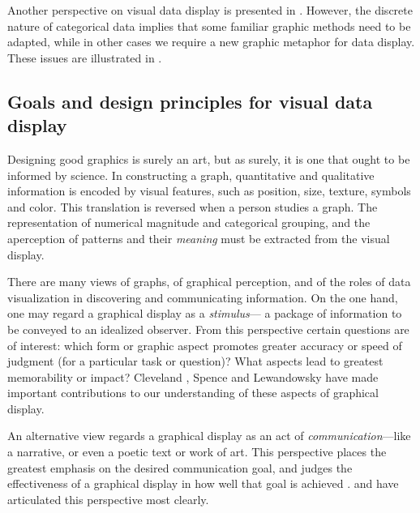 \documentclass[11pt]{book}\usepackage[]{graphicx}\usepackage[]{color}
\begin{document}
Another perspective on visual data display is presented in .
However, the discrete nature of categorical data implies that
some familiar graphic methods need to be adapted, while in other
cases we require a new graphic metaphor for data display.
These issues are illustrated in .

\subsection{Goals and design principles for visual data display}\label{sec:intro-goals}

Designing good graphics is surely an art, but as surely, it is
one that ought to be informed by science.
In constructing a graph, quantitative and qualitative information is
encoded by visual features, such as position, size, texture, symbols
and color. This translation is reversed when a person studies a
graph. The representation of numerical magnitude and categorical
grouping, and the aperception of patterns and their \emph{meaning} must be extracted from the visual display.  

There are many views of graphs, of graphical perception, and of
the roles of data visualization in discovering and communicating
information.
On the one hand, one may regard a graphical display as a \emph{stimulus}---
a package of information to be conveyed to an idealized observer.
From this perspective certain questions are of interest:  which
form or graphic aspect promotes greater accuracy or speed of judgment
(for a particular task or question)?  What aspects lead to greatest
memorability or impact? 
Cleveland \citep{ClevelandMcGill:84b,ClevelandMcGill:85,Cleveland:93:JCGS},
Spence and Lewandowsky 
\citep{LewandowskySpence:89,Spence:90,SpenceLewandowsky:90} have made important contributions to our understanding of
these aspects of graphical display.

An alternative view regards a graphical display as an act
of \emph{communication}---like a narrative, or even a poetic text or work of art. 
This perspective places the greatest emphasis on the desired
communication goal, and judges the effectiveness of a graphical
display in how well that goal is achieved \citep{FriendlyKwan:2011}.
\citet{Kosslyn:85,Kosslyn:89} and \citet{Tufte:83,Tufte:90,Tufte:97}
have articulated this perspective most clearly.
\end{document}
